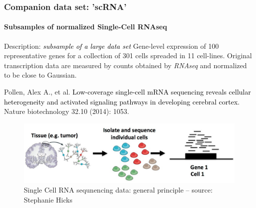 \documentclass{beamer}\usepackage[]{graphicx}\usepackage[]{color}
\begin{document}
\begin{frame}[fragile]
  \frametitle{Companion data set: 'scRNA'}
  \framesubtitle{Subsamples of normalized Single-Cell RNAseq}

\begin{block}{Description: \textcolor{black}{\it subsample of a large data set}}
\small Gene-level expression of 100 representative genes for a collection of 301 cells 
spreaded in 11 cell-lines. Original transcription data are measured by counts obtained by 
\textit{RNAseq} and normalized to be close to Gaussian.\\

\begin{scriptsize}
\begin{thebibliography}{9}
 Pollen, Alex A., et al. \textcolor{black}{Low-coverage single-cell mRNA sequencing reveals cellular heterogeneity and activated signaling pathways in developing cerebral cortex.} \newblock Nature biotechnology 32.10 (2014): 1053.
\end{thebibliography}
\end{scriptsize}
\end{block}

\begin{figure}
  \includegraphics[width=.9\textwidth]{figures/scRNA-overview}
  \caption{Single Cell RNA sequnencing data: general principle -- {\tiny source: Stephanie Hicks}}
\end{figure}

\end{frame}
\end{document}

